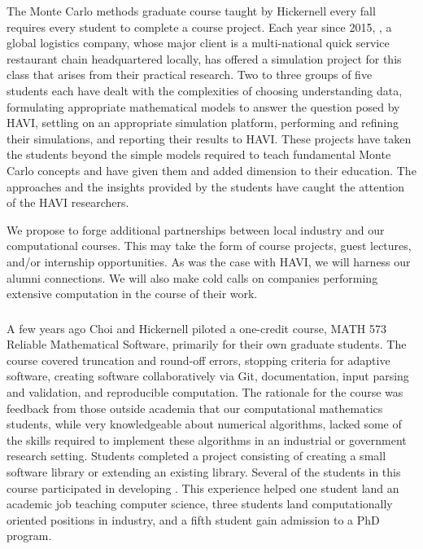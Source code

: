\documentclass[11pt]{NSFamsart}
\begin{document}
The Monte Carlo methods graduate course taught by Hickernell every fall requires every student to complete a course project.  Each year since 2015, \HAVI, a global logistics company, whose major client is a multi-national quick service restaurant chain headquartered locally, has offered a simulation project for this class that arises from their practical research.  Two to three groups of five students each have dealt with the complexities of choosing understanding data, formulating appropriate mathematical models to answer the question posed by HAVI, settling on an appropriate simulation platform, performing and refining their simulations, and reporting their results to HAVI.  These projects have taken the students beyond the simple models required to teach fundamental Monte Carlo concepts and have given them and added dimension to their education.  The approaches and the insights provided by the students have caught the attention of the HAVI researchers.

We propose to forge additional partnerships between local industry and our computational courses.  This may take the form of course projects, guest lectures, and/or internship opportunities.  As was the case with HAVI, we will harness our alumni connections.  We will also make cold calls on companies performing extensive computation in the course of their work.

\subsubsection{\RelSoftName} \label{RelSoft} A few years ago Choi and Hickernell piloted a one-credit course, MATH 573 Reliable Mathematical Software, primarily for their own graduate students.  The course covered truncation and round-off errors,
stopping criteria for adaptive software,
creating software collaboratively via Git, 
documentation,
input parsing and validation, and
reproducible computation.
The rationale for the course was feedback from those outside academia that our computational mathematics students, while very knowledgeable about numerical algorithms, lacked some of the skills required to implement these algorithms in an industrial or government research setting.
Students completed a project consisting of creating a small software library or extending an existing library.  Several of the students in this course participated in developing \GAIL \cite{ChoEtal17b}.  This experience helped one student land an academic job teaching computer science, three students land computationally oriented positions in industry, and a fifth student gain admission to a PhD program.
\end{document}
